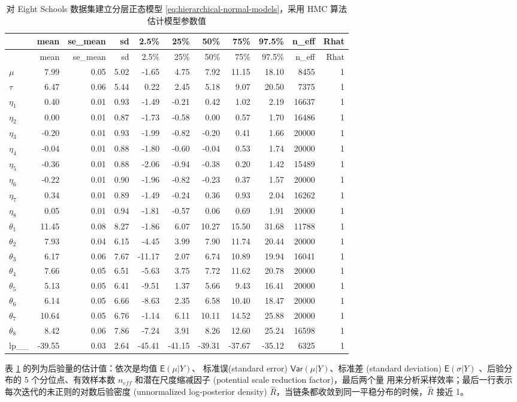\documentclass[12pt,a4paper,UTF8,twoside]{book}
\theoremstyle{definition}
\theoremstyle{definition}
\theoremstyle{definition}
\theoremstyle{remark}
\begin{document}
\begin{longtable}[]{@{}lrrrrrrrrrr@{}}
\caption{\label{tab:eight-schools-output} 对 Eight Schools
数据集建立分层正态模型 \eqref{eq:hierarchical-normal-models}，采用 HMC
算法估计模型参数值}\tabularnewline
\toprule
& mean & se\_mean & sd & 2.5\% & 25\% & 50\% & 75\% & 97.5\% & n\_eff &
Rhat\tabularnewline
\midrule
\endfirsthead
\toprule
& mean & se\_mean & sd & 2.5\% & 25\% & 50\% & 75\% & 97.5\% & n\_eff &
Rhat\tabularnewline
\midrule
\endhead
\(\mu\) & 7.99 & 0.05 & 5.02 & -1.65 & 4.75 & 7.92 & 11.15 & 18.10 &
8455 & 1\tabularnewline
\(\tau\) & 6.47 & 0.06 & 5.44 & 0.22 & 2.45 & 5.18 & 9.07 & 20.50 & 7375
& 1\tabularnewline
\(\eta_1\) & 0.40 & 0.01 & 0.93 & -1.49 & -0.21 & 0.42 & 1.02 & 2.19 &
16637 & 1\tabularnewline
\(\eta_2\) & 0.00 & 0.01 & 0.87 & -1.73 & -0.58 & 0.00 & 0.57 & 1.70 &
16486 & 1\tabularnewline
\(\eta_3\) & -0.20 & 0.01 & 0.93 & -1.99 & -0.82 & -0.20 & 0.41 & 1.66 &
20000 & 1\tabularnewline
\(\eta_4\) & -0.04 & 0.01 & 0.88 & -1.80 & -0.60 & -0.04 & 0.53 & 1.74 &
20000 & 1\tabularnewline
\(\eta_5\) & -0.36 & 0.01 & 0.88 & -2.06 & -0.94 & -0.38 & 0.20 & 1.42 &
15489 & 1\tabularnewline
\(\eta_6\) & -0.22 & 0.01 & 0.90 & -1.96 & -0.82 & -0.23 & 0.37 & 1.57 &
20000 & 1\tabularnewline
\(\eta_7\) & 0.34 & 0.01 & 0.89 & -1.49 & -0.24 & 0.36 & 0.93 & 2.04 &
16262 & 1\tabularnewline
\(\eta_8\) & 0.05 & 0.01 & 0.94 & -1.81 & -0.57 & 0.06 & 0.69 & 1.91 &
20000 & 1\tabularnewline
\(\theta_1\) & 11.45 & 0.08 & 8.27 & -1.86 & 6.07 & 10.27 & 15.50 &
31.68 & 11788 & 1\tabularnewline
\(\theta_2\) & 7.93 & 0.04 & 6.15 & -4.45 & 3.99 & 7.90 & 11.74 & 20.44
& 20000 & 1\tabularnewline
\(\theta_3\) & 6.17 & 0.06 & 7.67 & -11.17 & 2.07 & 6.74 & 10.89 & 19.94
& 16041 & 1\tabularnewline
\(\theta_4\) & 7.66 & 0.05 & 6.51 & -5.63 & 3.75 & 7.72 & 11.62 & 20.78
& 20000 & 1\tabularnewline
\(\theta_5\) & 5.13 & 0.05 & 6.41 & -9.51 & 1.37 & 5.66 & 9.43 & 16.41 &
20000 & 1\tabularnewline
\(\theta_6\) & 6.14 & 0.05 & 6.66 & -8.63 & 2.35 & 6.58 & 10.40 & 18.47
& 20000 & 1\tabularnewline
\(\theta_7\) & 10.64 & 0.05 & 6.76 & -1.14 & 6.11 & 10.11 & 14.52 &
25.88 & 20000 & 1\tabularnewline
\(\theta_8\) & 8.42 & 0.06 & 7.86 & -7.24 & 3.91 & 8.26 & 12.60 & 25.24
& 16598 & 1\tabularnewline
lp\_\_ & -39.55 & 0.03 & 2.64 & -45.41 & -41.15 & -39.31 & -37.67 &
-35.12 & 6325 & 1\tabularnewline
\bottomrule
\end{longtable}

表 \ref{tab:eight-schools-output} 的列为后验量的估计值：依次是均值
\(\mathsf{E}(\mu|Y)\)、 标准误(standard error)
\(\mathsf{Var}(\mu|Y)\)、标准差 (standard deviation)
\(\mathsf{E}(\sigma|Y)\) 、后验分布的 5 个分位点、有效样本数 \(n_{eff}\)
和潜在尺度缩减因子 (potential scale reduction factor)，最后两个量
用来分析采样效率；最后一行表示每次迭代的未正则的对数后验密度
(unnormalized log-posterior density)
\(\hat{R}\)，当链条都收敛到同一平稳分布的时候，\(\hat{R}\) 接近 1。
\end{document}
